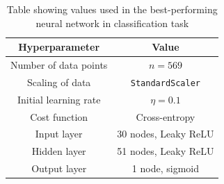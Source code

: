 \begin{table}[h!]
  \centering
  \small
  \begin{tabular}{|c|c|}
    \hline
    \textbf{Hyperparameter} & \textbf{Value} \\
    \hline
    Number of data points & $n = 569$ \\
    \hline
    Scaling of data & \texttt{StandardScaler} \\
    \hline
    Initial learning rate & $\eta = 0.1$ \\
    \hline
    Cost function & Cross-entropy \\
    \hline
    Input layer & 30 nodes, Leaky ReLU \\
    \hline
    Hidden layer & 51 nodes, Leaky ReLU \\
    \hline
    Output layer & 1 node, sigmoid \\
    \hline
  \end{tabular}
  \caption{Table showing values used in the best-performing neural network in classification task}
  \label{tab:classificationtask}
\end{table}


